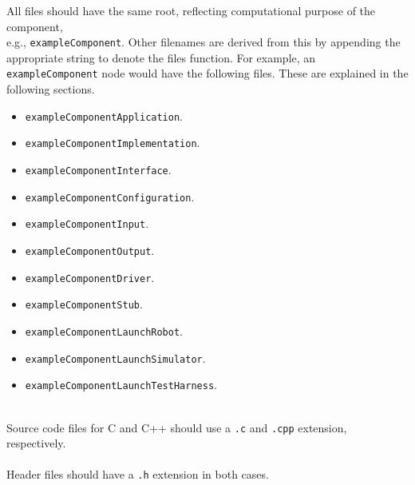 \documentclass{CSSRforAfrica}
\newcommand{\blank}{~\\}
\begin{document}
\begin{appendices}
All files should have the same root, reflecting computational purpose of the component, 
\blank
e.g.,  {\small \verb+exampleComponent+}.
Other filenames are derived from this by appending the appropriate string to denote the files function. For example, an {\small \verb+exampleComponent+} node would have the following files. \vspace{-2mm} These are explained in the following sections.
\begin{itemize}
\item {\small \verb+exampleComponentApplication+}. \vspace{-2mm}
\item {\small \verb+exampleComponentImplementation+}. \vspace{-2mm}
\item {\small \verb+exampleComponentInterface+}. \vspace{-2mm}
\item {\small \verb+exampleComponentConfiguration+}. \vspace{-2mm}
\item {\small \verb+exampleComponentInput+}. \vspace{-2mm}
\item {\small \verb+exampleComponentOutput+}. \vspace{-2mm}
\item {\small \verb+exampleComponentDriver+}. \vspace{-2mm}
\item {\small \verb+exampleComponentStub+}. \vspace{-2mm}
\item {\small \verb+exampleComponentLaunchRobot+}. \vspace{-2mm}
\item {\small \verb+exampleComponentLaunchSimulator+}. \vspace{-2mm}
\item {\small \verb+exampleComponentLaunchTestHarness+}. \vspace{-2mm}
\end{itemize}
\blank
 Source code files for C and C++ should use a  {\small \verb+.c+} and {\small \verb+.cpp+} extension, respectively.
\blank
~
\blank
Header files should have a {\small \verb+.h+} extension in both cases.


\end{appendices}
\end{document}
